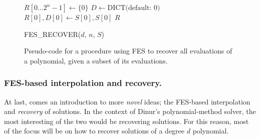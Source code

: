 \begin{figure}[th!]
    \begin{alg}
        $R[0\dots 2^n - 1] \gets \{0\}$\;
        $D \gets \text{DICT(default: 0)}$\;
        $R[0], D[0] \gets S[0], S[0]$\;
        \Return $R$\;
        \caption{FES\_RECOVER($d$, $n$, $S$)} \label{alg:fes_recover}
    \end{alg}
    \caption{Pseudo-code for a procedure using FES to recover all evaluations of a polynomial, given a subset of its evaluations.}
\end{figure}

\subsubsection{FES-based interpolation and recovery.} \label{sec:ext:fes_interp:interp_recover}

At last, comes an introduction to more \textit{novel} ideas; the FES-based interpolation and \textit{recovery} of solutions. In the context of Dinur's polynomial-method solver, the most interesting of the two would be recovering solutions. For this reason, most of the focus will be on how to recover solutions of a degree $d$ polynomial.

